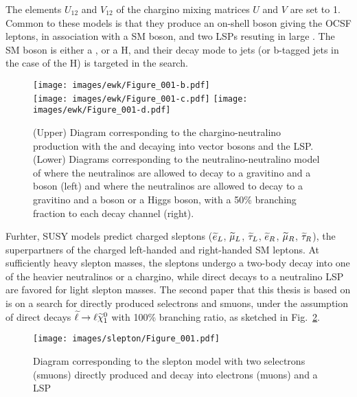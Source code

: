 The elements $U_{12}$ and $V_{12}$ of the chargino mixing matrices $U$ and $V$ are set to 1.
Common to these models is that they produce an on-shell \PZ boson giving the OCSF leptons, in association with a SM boson, and two LSPs resuting in large \ptmiss. 
The SM boson is either a \PW, \PZ or a H, and their decay mode to jets (or b-tagged jets in the case of the H) is targeted in the search.   
\begin{figure}[!h]
\centering
\texttt{[image: images/ewk/Figure\_001-b.pdf]}\\
\texttt{[image: images/ewk/Figure\_001-c.pdf]}
\texttt{[image: images/ewk/Figure\_001-d.pdf]}
\caption{(Upper) Diagram corresponding to the chargino-neutralino production with the \firstcharg and \secondchi decaying into vector bosons and the LSP. 
(Lower) Diagrams corresponding to the neutralino-neutralino model of where the neutralinos are allowed to decay to a gravitino and a \PZ boson (left) and where the neutralinos are allowed to decay to a gravitino and a \PZ boson or a Higgs boson, with a 50\% branching fraction to each decay channel (right).}
\label{sig:feynmanEWK}
\end{figure}                                                                                                                                 
Furhter, SUSY models predict charged sleptons ($\widetilde{e}_{L}$, $\widetilde{\mu}_{L}$, $\widetilde{\tau}_{L}$, $\widetilde{e}_{R}$, $\widetilde{\mu}_{R}$, $\widetilde{\tau}_{R}$), the superpartners of the charged left-handed and right-handed SM leptons. 
At sufficiently heavy slepton masses, the sleptons undergo a two-body decay into one of the heavier neutralinos or a chargino, while direct decays to a neutralino LSP are favored for light slepton masses.
The second paper that this thesis is based on is on a search for directly produced selectrons and smuons, under the assumption of direct decays $\widetilde{\ell}\to \ell\widetilde{\chi}^{0}_{1}$ with 100\% branching ratio, as sketched in Fig.~\ref{fig:feynmanSlepton}.
\begin{figure}[!h]
\centering
\texttt{[image: images/slepton/Figure\_001.pdf]}
\caption{Diagram corresponding to the slepton model with two selectrons (smuons) directly produced and decay into electrons (muons) and a LSP} 
\label{fig:feynmanSlepton}
\end{figure}                                                                                                                                 
